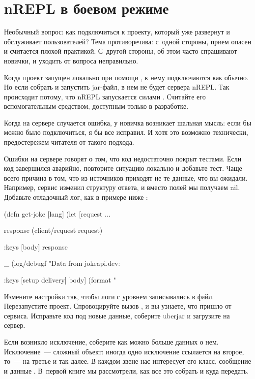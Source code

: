\section{nREPL в боевом режиме}

Необычный вопрос: как подключиться к проекту, который уже развернут и обслуживает пользователей? Тема противоречива: с~одной стороны, прием опасен и считается плохой практикой. С~другой стороны, об этом часто спрашивают новички, и уходить от вопроса неправильно.

Когда проект запущен локально при помощи , к нему подключаются как обычно. Но если собрать и запустить jar-файл, в нем не будет сервера nREPL. Так происходит потому, что nREPL запускается силами . Считайте его вспомогательным средством, доступным только в разработке.

Когда на сервере случается ошибка, у новичка возникает шальная мысль: если бы можно было подключиться, я бы все исправил. И хотя это возможно технически, предостережем читателя от такого подхода.

Ошибки на сервере говорят о том, что код недостаточно покрыт тестами. Если код завершился аварийно, повторите ситуацию локально и добавьте тест. Чаще всего причина в том, что из источников приходят не те данные, что вы ожидали. Например, сервис  изменил структуру ответа, и вместо полей мы получаем nil. Добавьте отладочный лог, как в примере ниже :

\begin{english}
  \begin{clojure/lines}
(defn get-joke [lang]
  (let [request
        {...}

        response
        (client/request request)

        {:keys [body]}
        response

        _ (log/debugf "Data from jokeapi.dev: %

        {:keys [setup delivery]}
        body]
    (format "%
  \end{clojure/lines}
\end{english}

Измените настройки так, чтобы логи с уровнем  записывались в файл. Перезапустите проект. Спровоцируйте вызов , и вы узнаете, что пришло от сервиса. Исправьте код под новые данные, соберите uberjar и загрузите на сервер.

Если возникло исключение, соберите как можно больше данных о нем. Исключение~--- сложный объект: иногда одно исключение ссылается на второе, то~--- на третье и так далее. В каждом звене нас интересует его класс, сообщение и данные . В~первой книге мы рассмотрели, как все это собрать и куда передать.

